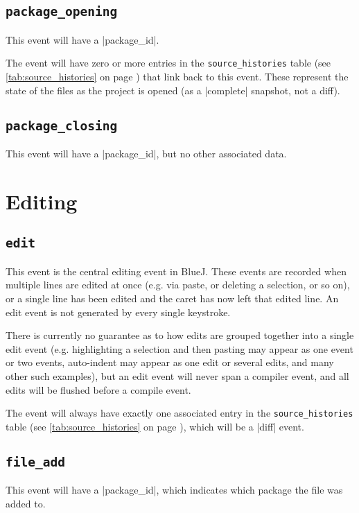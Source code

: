\documentclass{book}
\newcommand{\myref}[1]{\autoref{#1} on page \pageref*{#1}}
\newcommand{\tabref}[1]{\lstinline|#1| table (see \myref{tab:#1})}
\begin{document}
\subsection{\lstinline|package_opening|}

This event will have a |package_id|.

The event will have zero or more entries in the \tabref{source_histories} that
link back to this event.  These represent the state of the files as the project is
opened (as a |complete| snapshot, not a diff).

\subsection{\lstinline|package_closing|}

This event will have a |package_id|, but no other associated data.


\section{Editing}

\subsection{\lstinline|edit|}

This event is the central editing event in BlueJ.  These events are recorded
when multiple lines are edited at once (e.g. via paste, or deleting a
selection, or so on), or a single line has been edited and the caret
has now left that edited line.  An edit event is not generated by every single
keystroke.

There is currently no guarantee as to how edits are grouped together into a single edit
event (e.g. highlighting a selection and then pasting may appear as one event
or two events, auto-indent may appear as one edit or several edits, and many
other such examples), but an edit event will never span a compiler event, and
all edits will be flushed before a compile event.

The event will always have exactly one associated entry in the
\tabref{source_histories}, which will be a |diff| event.

\subsection{\lstinline|file_add|}

This event will have a |package_id|, which indicates which package the file
was added to.
\end{document}
